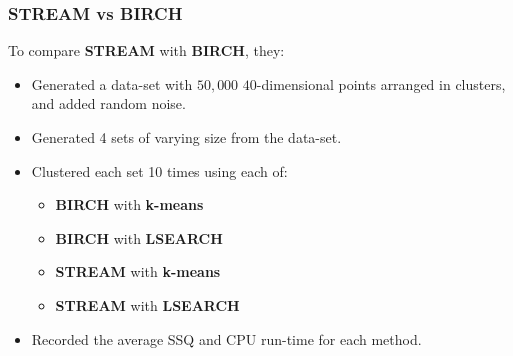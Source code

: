 \documentclass{beamer}
\begin{document}
\frame
{
  \frametitle{STREAM vs BIRCH}
  To compare \textbf{STREAM} with \textbf{BIRCH}, they:
  
  \bigskip
  \begin{itemize}
	\item{Generated a data-set with $50,000$ $40$-dimensional points arranged in clusters, and added random noise.}
	
	\bigskip
	\item{Generated 4 sets of varying size from the data-set.}
	
	\bigskip
	\item{Clustered each set 10 times using each of:
	  \begin{itemize}
	  	\item{\textbf{BIRCH} with \textbf{k-means}}
	  	\item{\textbf{BIRCH} with \textbf{LSEARCH}}
	  	\item{\textbf{STREAM} with \textbf{k-means}}
	  	\item{\textbf{STREAM} with \textbf{LSEARCH}}
	  \end{itemize}	   
	}
	
	\bigskip
	\item{Recorded the average SSQ and CPU run-time for each method.}
  \end{itemize}

}
\end{document}
